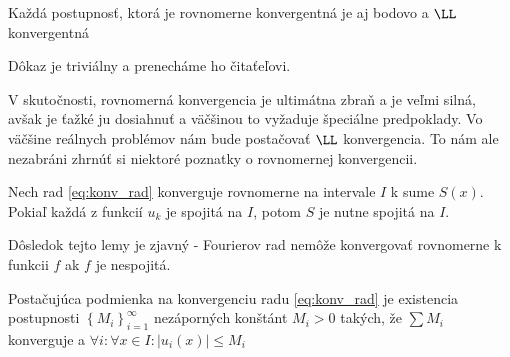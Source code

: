 \begin{lema}
    Každá postupnosť, ktorá je rovnomerne konvergentná je aj bodovo a
    $\LL$ konvergentná
\end{lema}
\begin{dokaz}
    Dôkaz je triviálny a prenecháme ho čitaťeľovi.
\end{dokaz}

V skutočnosti, rovnomerná konvergencia je ultimátna zbraň a je veľmi
silná, avšak je ťažké ju dosiahnuť a väčšinou to vyžaduje špeciálne
predpoklady. Vo väčšine reálnych problémov nám bude postačovať
$\LL$ konvergencia. To nám ale nezabráni zhrnúť si
niektoré poznatky o rovnomernej konvergencii.

\begin{lema}
    Nech rad \eqref{eq:konv_rad} konverguje rovnomerne na intervale $I$
    k sume $S(x)$. Pokiaľ každá z funkcií $u_k$ je spojitá na $I$,
    potom $S$ je nutne spojitá na $I$.
\end{lema}

Dôsledok tejto lemy je zjavný - Fourierov rad nemôže konvergovať
rovnomerne k funkcii $f$ ak $f$ je nespojitá.

\begin{lema}
  Postačujúca podmienka na konvergenciu radu \eqref{eq:konv_rad}
  je existencia postupnosti $\left\{M_i\right\}_{i=1}^\infty$
  nezáporných konštánt $M_i>0$ takých, že
  $\sum M_i$ konverguje a $\forall i: \forall x\in I: |u_i(x)|\le M_i$
\end{lema}
